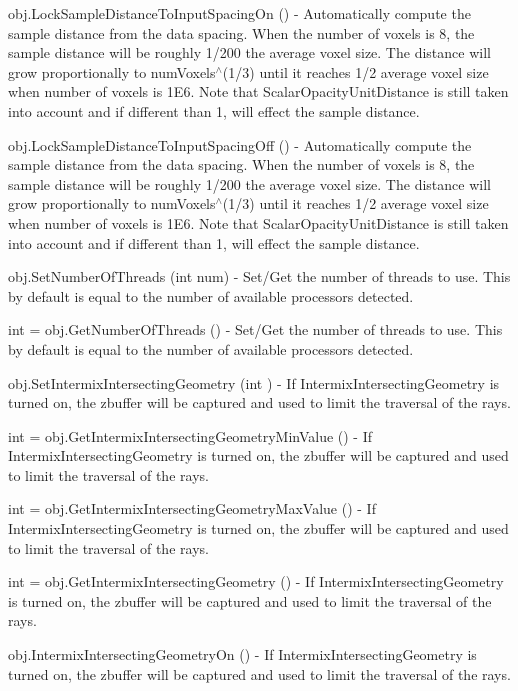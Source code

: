 \begin{DoxyItemize}
\item {\ttfamily obj.\-Lock\-Sample\-Distance\-To\-Input\-Spacing\-On ()} -\/ Automatically compute the sample distance from the data spacing. When the number of voxels is 8, the sample distance will be roughly 1/200 the average voxel size. The distance will grow proportionally to num\-Voxels$^\wedge$(1/3) until it reaches 1/2 average voxel size when number of voxels is 1\-E6. Note that Scalar\-Opacity\-Unit\-Distance is still taken into account and if different than 1, will effect the sample distance.  
\item {\ttfamily obj.\-Lock\-Sample\-Distance\-To\-Input\-Spacing\-Off ()} -\/ Automatically compute the sample distance from the data spacing. When the number of voxels is 8, the sample distance will be roughly 1/200 the average voxel size. The distance will grow proportionally to num\-Voxels$^\wedge$(1/3) until it reaches 1/2 average voxel size when number of voxels is 1\-E6. Note that Scalar\-Opacity\-Unit\-Distance is still taken into account and if different than 1, will effect the sample distance.  
\item {\ttfamily obj.\-Set\-Number\-Of\-Threads (int num)} -\/ Set/\-Get the number of threads to use. This by default is equal to the number of available processors detected.  
\item {\ttfamily int = obj.\-Get\-Number\-Of\-Threads ()} -\/ Set/\-Get the number of threads to use. This by default is equal to the number of available processors detected.  
\item {\ttfamily obj.\-Set\-Intermix\-Intersecting\-Geometry (int )} -\/ If Intermix\-Intersecting\-Geometry is turned on, the zbuffer will be captured and used to limit the traversal of the rays.  
\item {\ttfamily int = obj.\-Get\-Intermix\-Intersecting\-Geometry\-Min\-Value ()} -\/ If Intermix\-Intersecting\-Geometry is turned on, the zbuffer will be captured and used to limit the traversal of the rays.  
\item {\ttfamily int = obj.\-Get\-Intermix\-Intersecting\-Geometry\-Max\-Value ()} -\/ If Intermix\-Intersecting\-Geometry is turned on, the zbuffer will be captured and used to limit the traversal of the rays.  
\item {\ttfamily int = obj.\-Get\-Intermix\-Intersecting\-Geometry ()} -\/ If Intermix\-Intersecting\-Geometry is turned on, the zbuffer will be captured and used to limit the traversal of the rays.  
\item {\ttfamily obj.\-Intermix\-Intersecting\-Geometry\-On ()} -\/ If Intermix\-Intersecting\-Geometry is turned on, the zbuffer will be captured and used to limit the traversal of the rays.  

\end{DoxyItemize}
